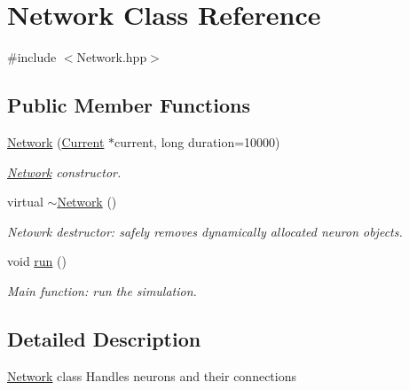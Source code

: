 \hypertarget{classNetwork}{\section{Network Class Reference}
\label{classNetwork}
}


{\ttfamily \#include $<$Network.\-hpp$>$}

\subsection*{Public Member Functions}
\begin{DoxyCompactItemize}
\item 
\hyperlink{classNetwork_a5fcb2ec1ac92e354f01b5e1b575dd41b}{Network} (\hyperlink{classCurrent}{Current} $\ast$current, long duration=10000)
\begin{DoxyCompactList}\small\item\em \hyperlink{classNetwork}{Network} constructor. \end{DoxyCompactList}\item 
\hypertarget{classNetwork_a7a4e19cdb4bf0c7ecf82baa643831492}{virtual \hyperlink{classNetwork_a7a4e19cdb4bf0c7ecf82baa643831492}{$\sim$\-Network} ()}\label{classNetwork_a7a4e19cdb4bf0c7ecf82baa643831492}

\begin{DoxyCompactList}\small\item\em Netowrk destructor\-: safely removes dynamically allocated neuron objects. \end{DoxyCompactList}\item 
\hypertarget{classNetwork_acc13a2e54ee332bb9f288f953ae141ed}{void \hyperlink{classNetwork_acc13a2e54ee332bb9f288f953ae141ed}{run} ()}\label{classNetwork_acc13a2e54ee332bb9f288f953ae141ed}

\begin{DoxyCompactList}\small\item\em Main function\-: run the simulation. \end{DoxyCompactList}\end{DoxyCompactItemize}


\subsection{Detailed Description}
\hyperlink{classNetwork}{Network} class Handles neurons and their connections 

